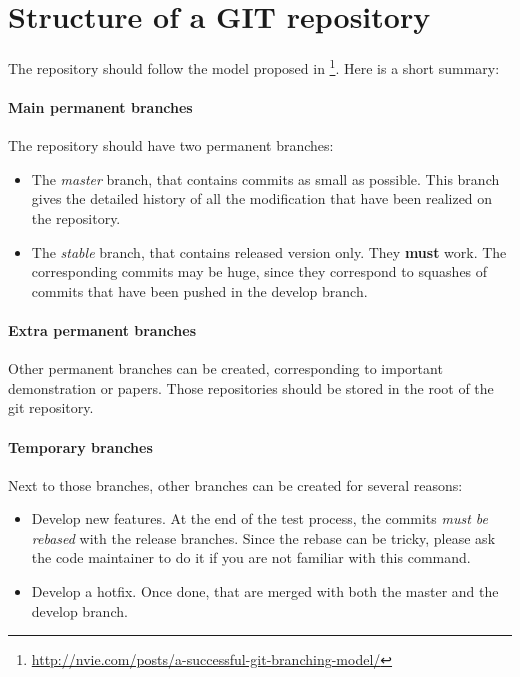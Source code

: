 \section{Structure of a GIT repository}
The repository should follow the model proposed in \footnote{\url{http://nvie.com/posts/a-successful-git-branching-model/}}.
Here is a short summary:
\paragraph{Main permanent branches}
The repository should have two permanent branches:
\begin{itemize}
\item The \textit{master} branch, that contains commits as small as possible. This branch gives the detailed history of all the modification that have been realized on the repository. 
\item The \textit{stable} branch, that contains released version only. They \textbf{must} work. The corresponding commits may be huge, since they correspond to squashes of commits that have been pushed in the develop branch.
\end{itemize}

\paragraph{Extra permanent branches}
Other permanent branches can be created, corresponding to important demonstration or papers.
Those repositories should be stored in the root of the git repository.

\paragraph{Temporary branches}
Next to those branches, other branches can be created for several reasons:
\begin{itemize}
\item Develop new features. At the end of the test process, the commits \textit{must be rebased} with the release branches. Since the rebase can be tricky, please ask the code maintainer to do it if you are not familiar with this command.
\item Develop a hotfix. Once done, that are merged with both the master and the develop branch. 
\end{itemize}

